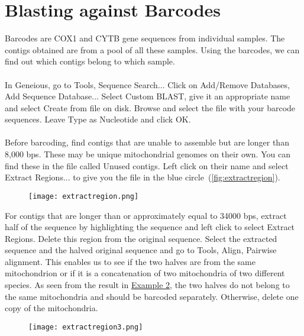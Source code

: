 \documentclass[11pt]{article}
\newcommand{\exautoref}[1]{\hyperref[#1]{Example \ref*{#1}}}
\begin{document}
\newpage
\section{Blasting against Barcodes}
\label{sec:Blasting}
Barcodes are COX1 and CYTB gene sequences from individual samples. The contigs obtained are from a pool of all these samples. Using the barcodes, we can find out which contigs belong to which sample.
\\
\\
In Geneious, go to Tools, Sequence Search... Click on Add/Remove Databases, Add Sequence Database... Select Custom BLAST, give it an appropriate name and select Create from file on disk. Browse and select the file with your barcode sequences. Leave Type as Nucleotide and click OK. 
\\
\\
Before barcoding, find contigs that are unable to assemble but are longer than 8,000 bps. These may be unique mitochondrial genomes on their own. You can find these in the file called Unused contigs. Left click on their name and select Extract Regions... to give you the file in the blue circle~(\autoref{fig:extractregion}).  

\begin{figure}[H]
  \centering
    \texttt{[image: extractregion.png]}
  \label{fig:extractregion}
\end{figure}

For contigs that are longer than or approximately equal to 34000 bps, extract half of the sequence by highlighting the sequence and left click to select Extract Regions. Delete this region from the original sequence. Select the extracted sequence and the halved original sequence and go to Tools, Align, Pairwise alignment. This enables us to see if the two halves are from the same mitochondrion or if it is a concatenation of two mitochondria of two different species. As seen from the result in \exautoref{fig:extractregion3}, the two halves do not belong to the same mitochondria and should be barcoded separately. Otherwise, delete one copy of the mitochondria.

\begin{figure}[H]
  \centering
    \texttt{[image: extractregion3.png]}
  \label{fig:extractregion3}
\end{figure}
\end{document}
